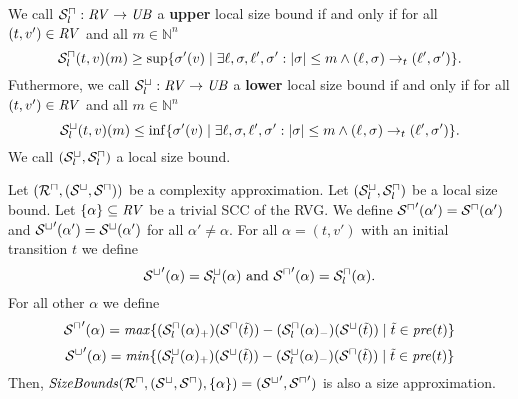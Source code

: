 \begin{definition}
  We call ${\mathcal{S}^\sqcap_l}: \mathit{RV} \rightarrow \mathit{UB}$ a \textbf{upper} local size bound if and only if for all $(t, v') \in \mathit{RV}$ and all $m \in \mathbb{N}^n$
  \[ {\mathcal{S}^\sqcap_l}(t, v)(m) \geq \sup \lbrace \sigma'(v) \mid \exists \ell, \sigma, \ell', \sigma': \left|\sigma\right| \leq m \wedge (\ell_{}, \sigma_{}) \rightarrow_t (\ell', \sigma') \rbrace. \]
  Futhermore, we call ${\mathcal{S}^\sqcup_l}: \mathit{RV} \rightarrow \mathit{UB}$ a \textbf{lower} local size bound if and only if for all $(t, v') \in \mathit{RV}$ and all $m \in \mathbb{N}^n$
  \[ {\mathcal{S}^\sqcup_l}(t, v)(m) \leq \inf \lbrace \sigma'(v) \mid \exists \ell, \sigma, \ell', \sigma': \left|\sigma\right| \leq m \wedge (\ell_{}, \sigma_{}) \rightarrow_t (\ell', \sigma') \rbrace. \]
  We call ${({\mathcal{S}^\sqcup_l}, {\mathcal{S}^\sqcap_l})}$ a local size bound.
\end{definition}

\begin{theorem}
  Let $({\mathcal{R}^\sqcap}, {({\mathcal{S}^\sqcup}, {\mathcal{S}^\sqcap})})$ be a complexity approximation.
  Let ${({\mathcal{S}^\sqcup_l}, {\mathcal{S}^\sqcap_l})}$ be a local size bound.
  Let $\lbrace \alpha \rbrace \subseteq \mathit{RV}$ be a trivial SCC of the RVG.
  We define ${\mathcal{S}^\sqcap}'(\alpha') = {\mathcal{S}^\sqcap}(\alpha')$ and ${\mathcal{S}^\sqcup}'(\alpha') = {\mathcal{S}^\sqcup}(\alpha')$ for all $\alpha' \neq \alpha$.
  For all $\alpha = (t, v')$ with an initial transition $t$ we define
  \[ {\mathcal{S}^\sqcup}'(\alpha) = {\mathcal{S}^\sqcup_l}(\alpha) \text{ and } {\mathcal{S}^\sqcap}'(\alpha) = {\mathcal{S}^\sqcap_l}(\alpha). \]
  For all other $\alpha$ we define 
  \[ {\mathcal{S}^\sqcap}'(\alpha) = \mathit{max} \lbrace  ({\mathcal{S}^\sqcap_l}(\alpha)_+)({\mathcal{S}^\sqcap}(\tilde{t})) - ({\mathcal{S}^\sqcap_l}(\alpha)_-)({\mathcal{S}^\sqcup}(\tilde{t})) \mid \tilde{t} \in \mathit{pre}(t) \rbrace \]
  \[ {\mathcal{S}^\sqcup}'(\alpha) = \mathit{min} \lbrace  ({\mathcal{S}^\sqcup_l}(\alpha)_+)({\mathcal{S}^\sqcup}(\tilde{t})) - ({\mathcal{S}^\sqcup_l}(\alpha)_-)({\mathcal{S}^\sqcap}(\tilde{t})) \mid \tilde{t} \in \mathit{pre}(t) \rbrace \]
  Then, $\mathit{SizeBounds}({\mathcal{R}^\sqcap}, {({\mathcal{S}^\sqcup}, {\mathcal{S}^\sqcap})}, \lbrace \alpha \rbrace) = ({\mathcal{S}^\sqcup}', {\mathcal{S}^\sqcap}')$ is also a size approximation.
\end{theorem}
